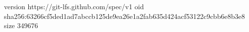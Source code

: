 version https://git-lfs.github.com/spec/v1
oid sha256:63266cf5ded1ad7abccb125de9ea26e1a2fab635d424acf53122c9cbb6e8b3e8
size 349676

